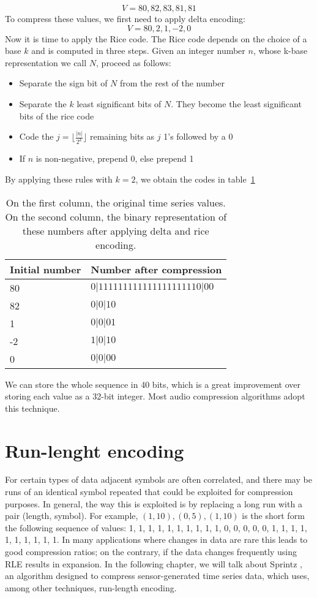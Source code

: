 $$V= 80, 82, 83, 81, 81$$
To compress these values, we first need to apply delta encoding:
$$V = 80, 2, 1, -2, 0$$
Now it is time to apply the Rice code. The Rice code depends on the choice of a base
$k$ and is computed in three steps. Given an integer number $n$, whose k-base representation
we call $N$, proceed as follows:
\begin{itemize}
	\item Separate the sign bit of $N$ from the rest of the number
	\item Separate the $k$ least significant bits of $N$. They become the least significant
    bits of the rice code
	\item Code the $j = \lfloor\frac{|n|}{2^k}\rfloor$ remaining bits as $j$ 1’s followed by a 0
	\item If $n$ is non-negative, prepend 0, else prepend 1
\end{itemize}
By applying these rules with $k = 2$, we obtain the codes in table~\ref{tab:rice}
\begin{table}[]
\centering
\begin{tabular}{l|l}
\textbf{Initial number}     & \textbf{Number after compression} \\ 
\hline
80          & $0|111111111111111111110|00$ \\                    
82          & $0|0|10$                     \\ 
1           & $0|0|01$                     \\              
-2          & $1|0|10$                     \\           
0           & $0|0|00$                     \\            
\end{tabular}
\caption{On the first column, the original time series values.
On the second column, the binary representation of these numbers after applying delta and rice
encoding.}
\label{tab:rice}
\end{table}
We can store the whole sequence in 40 bits, which is a great improvement over storing each
value as a 32-bit integer. Most audio compression algorithms adopt this technique.

\section{Run-lenght encoding}
For certain types of data adjacent symbols are often correlated, and there may be runs of an
identical symbol repeated that could be exploited for compression purposes. In general, the way
this is exploited is by replacing a long run with a pair (length, symbol). For example,
$(1, 10), (0, 5), (1, 10)$ is the short form the following sequence of values:
1, 1, 1, 1, 1, 1, 1, 1, 1, 1, 0, 0, 0, 0, 0, 1, 1, 1, 1, 1, 1, 1, 1, 1, 1.
In many applications where changes in data are rare this leads to good compression ratios;
on the contrary, if the data changes frequently using RLE results in expansion. In the
following chapter, we will talk about Sprintz \cite{Blalock2018Sprintz},
an algorithm designed to compress sensor-generated time series data, which uses, among other
techniques, run-length encoding.

